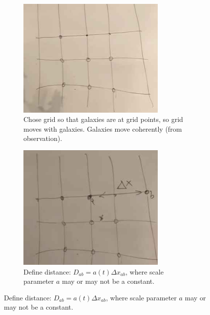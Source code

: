 \documentclass[]{article}
\begin{document}
\begin{figure}[H]
	\begin{center}
		\caption{We start by introducing a set of coordinates.}
		\begin{subfigure}[t]{0.45\textwidth}
			\caption{Chose grid so that galaxies are at grid points, so grid moves with galaxies. Galaxies move coherently (from observation).}\label{fig:cosmo-1-grid}
			\includegraphics[width=0.8\textwidth]{cosmo-1-grid}
		\end{subfigure}
		\;
		\begin{subfigure}[t]{0.45\textwidth}
			\caption{Define distance: $D_{ab}=a(t) \Delta x_{ab}$, where scale parameter $a$ may or may not be a constant.}\label{fig:cosmo-1-distance}
			\includegraphics[width=0.8\textwidth]{cosmo-1-distance}
		\end{subfigure}
	\end{center}
\end{figure}
 
\end{document}
